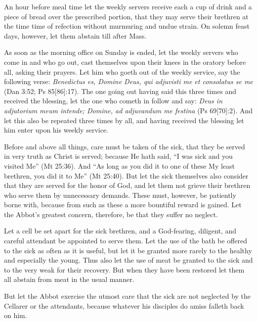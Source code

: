 An hour before meal time let the weekly servers receive each a cup of drink and a piece of bread over the prescribed portion, that they may serve their brethren at the time time of refection without murmuring and undue strain. On solemn feast days, however, let them abstain till after Mass.

As soon as the morning office on Sunday is ended, let the weekly servers who come in and who go out, cast themselves upon their knees in the oratory before all, asking their prayers. Let him who goeth out of the weekly service, say the following verse: \emph{Benedictus es, Domine Deus, qui adjuvisti me et consolatus se me} (Dan 3:52; Ps 85[86]:17). The one going out having said this three times and received the blessing, let the one who cometh in follow and say: \emph{Deus in adjutorium meum intende; Domine, ad adjuvandum me festina} (Ps 69[70]:2). And let this also be repeated three times by all, and having received the blessing let him enter upon his weekly service.


Before and above all things, care must be taken of the sick, that they be served in very truth as Christ is served; because He hath said, ``I was sick and you visited Me'' (Mt 25:36). And ``As long as you did it to one of these My least brethren, you did it to Me'' (Mt 25:40). But let the sick themselves also consider that they are served for the honor of God, and let them not grieve their brethren who serve them by unnecessary demands. These must, however, be patiently borne with, because from such as these a more bountiful reward is gained. Let the Abbot's greatest concern, therefore, be that they suffer no neglect.

Let a cell be set apart for the sick brethren, and a God-fearing, diligent, and careful attendant be appointed to serve them. Let the use of the bath be offered to the sick as often as it is useful, but let it be granted more rarely to the healthy and especially the young. Thus also let the use of meat be granted to the sick and to the very weak for their recovery. But when they have been restored let them all abstain from meat in the usual manner.

But let the Abbot exercise the utmost care that the sick are not neglected by the Cellarer or the attendants, because whatever his disciples do amiss falleth back on him.


